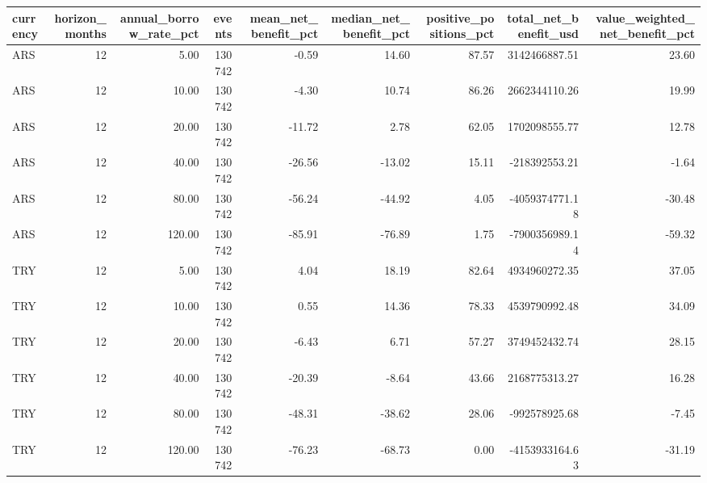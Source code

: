 \begin{tabular}{lrrrrrrrr}
\toprule
currency & horizon\_months & annual\_borrow\_rate\_pct & events & mean\_net\_benefit\_pct & median\_net\_benefit\_pct & positive\_positions\_pct & total\_net\_benefit\_usd & value\_weighted\_net\_benefit\_pct \\
\midrule
ARS & 12 & 5.00 & 130742 & -0.59 & 14.60 & 87.57 & 3142466887.51 & 23.60 \\
ARS & 12 & 10.00 & 130742 & -4.30 & 10.74 & 86.26 & 2662344110.26 & 19.99 \\
ARS & 12 & 20.00 & 130742 & -11.72 & 2.78 & 62.05 & 1702098555.77 & 12.78 \\
ARS & 12 & 40.00 & 130742 & -26.56 & -13.02 & 15.11 & -218392553.21 & -1.64 \\
ARS & 12 & 80.00 & 130742 & -56.24 & -44.92 & 4.05 & -4059374771.18 & -30.48 \\
ARS & 12 & 120.00 & 130742 & -85.91 & -76.89 & 1.75 & -7900356989.14 & -59.32 \\
TRY & 12 & 5.00 & 130742 & 4.04 & 18.19 & 82.64 & 4934960272.35 & 37.05 \\
TRY & 12 & 10.00 & 130742 & 0.55 & 14.36 & 78.33 & 4539790992.48 & 34.09 \\
TRY & 12 & 20.00 & 130742 & -6.43 & 6.71 & 57.27 & 3749452432.74 & 28.15 \\
TRY & 12 & 40.00 & 130742 & -20.39 & -8.64 & 43.66 & 2168775313.27 & 16.28 \\
TRY & 12 & 80.00 & 130742 & -48.31 & -38.62 & 28.06 & -992578925.68 & -7.45 \\
TRY & 12 & 120.00 & 130742 & -76.23 & -68.73 & 0.00 & -4153933164.63 & -31.19 \\
\bottomrule
\end{tabular}
